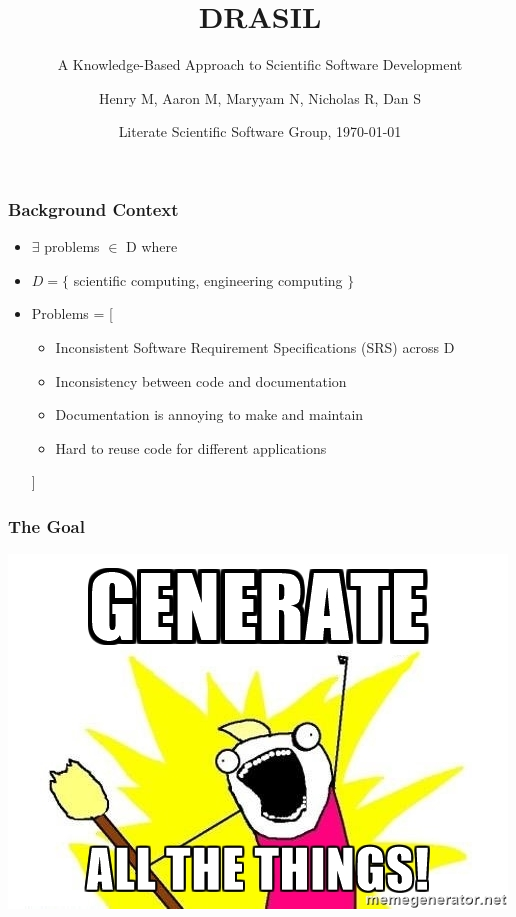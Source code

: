 \documentclass{beamer}
\title{DRASIL}
\subtitle{A Knowledge-Based Approach to Scientific Software Development}
\author{Henry M, Aaron M, Maryyam N, Nicholas R, Dan S}
\institute{McMaster University}
\date[LSS \today]{Literate Scientific Software Group, \today}
\begin{document}
\frame{\titlepage}

\begin{frame}
\frametitle{Background Context}
\begin{itemize}
 \item $\exists$ problems $\in$ D where
 \item $D = \{$ scientific computing, engineering computing $\}$
 \item Problems = [\\
  \begin{itemize}
   \item Inconsistent Software Requirement Specifications (SRS) across D
   \item Inconsistency between code and documentation
   \item Documentation is annoying to make and maintain
   \item Hard to reuse code for different applications
  \end{itemize}
 ]
\end{itemize}
\end{frame}

\begin{frame}
\frametitle{The Goal}
\centering
\includegraphics[scale=0.7]{../WG2_11/generate_all_the_things.jpg}
\end{frame}
\end{document}
